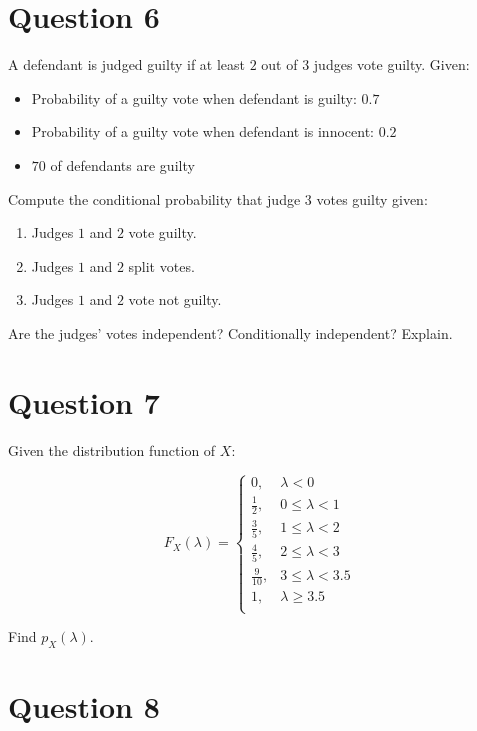 \documentclass[
  letterpaper,
  DIV=11,
  numbers=noendperiod]{scrreprt}
\providecommand{\tightlist}{%
  \setlength{\itemsep}{0pt}\setlength{\parskip}{0pt}}\usepackage{longtable,booktabs,array}
\begin{document}
\section{Question 6}\label{question-6}

A defendant is judged guilty if at least \(2\) out of \(3\) judges vote
guilty. Given:

\begin{itemize}
\tightlist
\item
  Probability of a guilty vote when defendant is guilty: \(0.7\)
\item
  Probability of a guilty vote when defendant is innocent: \(0.2\)
\item
  \(70%
  \) of defendants are guilty
\end{itemize}

Compute the conditional probability that judge \(3\) votes guilty given:

\begin{enumerate}
\def\labelenumi{\arabic{enumi}.}
\tightlist
\item
  Judges \(1\) and \(2\) vote guilty.
\item
  Judges \(1\) and \(2\) split votes.
\item
  Judges \(1\) and \(2\) vote not guilty.
\end{enumerate}

Are the judges' votes independent? Conditionally independent? Explain.

\section{Question 7}\label{question-7}

Given the distribution function of \(X\):

\[
F_{X}(\lambda) = 
\begin{cases}
0, & \lambda < 0 \\
\frac{1}{2}, & 0 \leq \lambda < 1 \\
\frac{3}{5}, & 1 \leq \lambda < 2 \\
\frac{4}{5}, & 2 \leq \lambda < 3 \\
\frac{9}{10}, & 3 \leq \lambda < 3.5 \\
1, & \lambda \geq 3.5 \\
\end{cases}
\]

Find \(p_X(\lambda)\).

\section{Question 8}\label{question-8}
\end{document}
